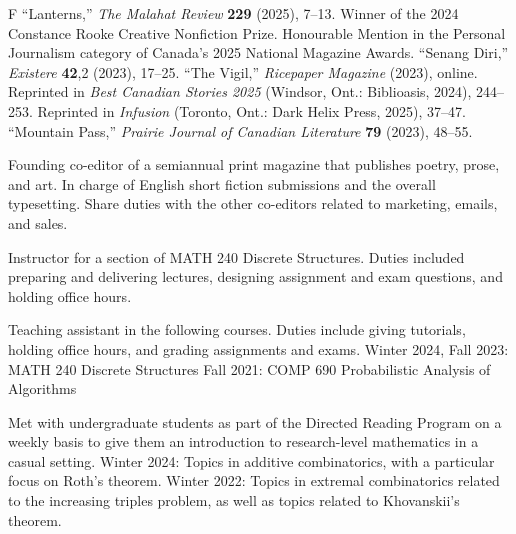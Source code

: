 \goodbreak


\pubbegin F
\starficitem ``Lanterns,'' {\sl The Malahat Review} {\bf 229} (2025), 7--13.
Winner of the 2024 Constance Rooke Creative Nonfiction Prize. Honourable Mention in the Personal Journalism
category of Canada's 2025 National Magazine Awards.
\ficitem ``Senang Diri,'' {\sl Existere} {\bf 42},2 (2023), 17--25.
\ficitem ``The Vigil,'' {\sl Ricepaper Magazine} (2023), online. Reprinted in
{\sl Best Canadian Stories 2025} (Windsor, Ont.: Biblioasis, 2024), 244--253.
Reprinted in {\sl Infusion} (Toronto, Ont.: Dark Helix Press, 2025), 37--47.
\ficitem ``Mountain Pass,'' {\sl Prairie Journal of Canadian Literature} {\bf 79} (2023), 48--55.
\endgroup%


\smallskip
Founding co-editor of a semiannual print magazine that publishes poetry, prose, and art.
In charge of English short fiction submissions and the overall typesetting. Share duties with the other
co-editors related to marketing, emails, and sales.
\medbreak

\smallskip
Instructor for a section of MATH 240 Discrete Structures. Duties included preparing and delivering lectures,
designing assignment and exam questions, and holding office hours.
\medbreak

\smallskip
Teaching assistant in the following courses. Duties include giving tutorials, holding office hours, and
grading assignments and exams.
\begingroup\parindent=10pt
\smallskip
\thing Winter 2024, Fall 2023: MATH 240 Discrete Structures
\smallskip
\thing Fall 2021: COMP 690 Probabilistic Analysis of Algorithms
\endgroup
\medbreak

\smallskip
Met with undergraduate students as part of the Directed Reading Program
on a weekly basis to give them an introduction to research-level
mathematics in a casual setting.
\begingroup\parindent=10pt
\smallskip
\thing Winter 2024: Topics in additive combinatorics, with a particular focus on Roth's theorem.
\smallskip
\thing Winter 2022: Topics in extremal combinatorics related to the increasing
triples problem, as well as topics related to Khovanskii's theorem.
\endgroup
\medbreak


